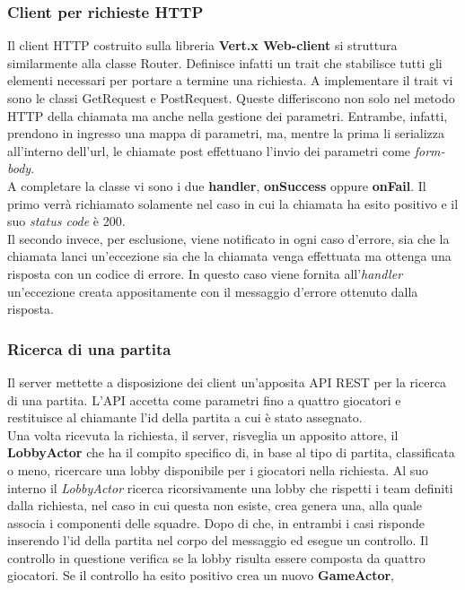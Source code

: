 	\subsubsection{Client per richieste HTTP}
	  Il client HTTP costruito sulla libreria \textbf{Vert.x Web-client} si struttura similarmente alla classe Router. Definisce infatti un trait che stabilisce tutti gli elementi necessari per portare a termine una richiesta. 
	  A implementare il trait vi sono le classi GetRequest e PostRequest. Queste differiscono non solo nel metodo HTTP della chiamata ma anche nella gestione dei parametri. Entrambe, infatti, prendono in ingresso una mappa di parametri, ma, mentre la prima li serializza all'interno dell'url, le chiamate post effettuano l'invio dei parametri come \textit{form-body}.\\
	  A completare la classe vi sono i due \textbf{handler}, \textbf{onSuccess} oppure \textbf{onFail}. Il primo verrà richiamato solamente nel caso in cui la chiamata ha esito positivo e il suo \textit{status code} è 200. \\
	  Il secondo invece, per esclusione, viene notificato in ogni caso d'errore, sia che la chiamata lanci un'eccezione sia che la chiamata venga effettuata ma ottenga una risposta con un codice di errore. In questo caso viene fornita all'\textit{handler} un'eccezione creata appositamente con il messaggio d'errore ottenuto dalla risposta. 
	  
        \subsubsection{Ricerca di una partita}
          Il server mettette a disposizione dei client un'apposita API REST per la ricerca di una partita. L'API accetta come parametri fino a quattro giocatori e restituisce al chiamante l'id della partita a cui è stato assegnato.
          \\
          Una volta ricevuta la richiesta, il server, risveglia un apposito attore, il \textbf{LobbyActor} che ha il compito specifico di, in base al tipo di partita, classificata o meno, ricercare una lobby disponibile per i giocatori nella richiesta. Al suo interno il \textit{LobbyActor} ricerca ricorsivamente una lobby che rispetti i team definiti dalla richiesta, nel caso in cui questa non esiste, crea genera una, alla quale associa i componenti delle squadre. Dopo di che, in entrambi i casi risponde inserendo l'id della partita nel corpo del messaggio ed esegue un controllo. Il controllo in questione verifica se la lobby risulta essere composta da quattro giocatori. Se il controllo ha esito positivo crea un nuovo \textbf{GameActor},
        
